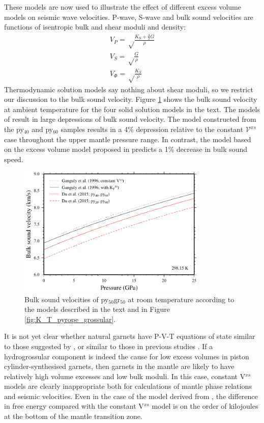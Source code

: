 \documentclass[review]{elsarticle}
\begin{document}
These models are now used to illustrate the effect of different excess volume models on seismic wave velocities. P-wave, S-wave and bulk sound velocities are functions of isentropic bulk and shear moduli and density:
\begin{eqnarray}
V_P = \sqrt \frac{K_S + \frac{4}{3} G }{\rho} \\
V_S = \sqrt \frac{G}{\rho} \\
V_\Phi = \sqrt \frac{K_S}{\rho}
\end{eqnarray}
Thermodynamic solution models say nothing about shear moduli, so we restrict our discussion to the bulk sound velocity. Figure \ref{fig:bulk_sound_garnet} shows the bulk sound velocity at ambient temperature for the four solid solution models in the text. The models of \cite{DCW2015} result in large depressions of bulk sound velocity. The model constructed from the py$_{40}$ and py$_{60}$ samples results in a 4\% depression relative to the constant $\mathcal{V}^{xs}$ case throughout the upper mantle pressure range. In contrast, the model based on the excess volume model proposed in \cite{GCT1996} predicts a 1\% decrease in bulk sound speed. 

\begin{figure}[ht!]
  \centering
  \includegraphics[width=0.8\textwidth]{figures/pyrope_grossular_bulk_sound_velocities}
  \caption{Bulk sound velocities of py$_{50}$gr$_{50}$ at room temperature according to the models described in the text and in Figure \ref{fig:K_T_pyrope_grossular}.}
  \label{fig:bulk_sound_garnet}
\end{figure}

It is not yet clear whether natural garnets have P-V-T equations of state similar to those suggested by \cite{DCW2015}, or similar to those in previous studies \citep{NCK1977, BG1997, GCT1996}. If a hydrogrossular component is indeed the cause for low excess volumes in piston cylinder-synthesised garnets, then garnets in the mantle are likely to have relatively high volume excesses and low bulk moduli. In this case, constant V$^{xs}$ models are clearly inappropriate both for calculations of mantle phase relations and seismic velocities. Even in the case of the model derived from \cite{GCT1996}, the difference in free energy compared with the constant V$^{xs}$ model is on the order of kilojoules at the bottom of the mantle transition zone. 
\end{document}
